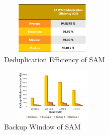 \documentclass[journal]{IEEEtran}
\begin{document}
\begin{figure}[!t]
\centering
\includegraphics[height=1in, width=2in]{image8.png}
\caption{Deduplication Efficiency of SAM}
\end{figure}

\begin{figure}[!t]
\centering
\includegraphics[height=1in, width=2in]{image9.png}
\caption{Backup Window of SAM}
\end{figure}
\end{document}
